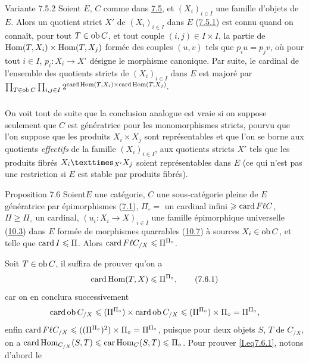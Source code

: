 \documentclass[10pt]{../fichiers-configuration-latex/smfart}
\begin{document}
\begin{enonce*}[remark]{Variante 7.5.2}
Soient $E$, $C$ comme dans \hyperref[I.cor7.5]{7.5}, et $(X_i)_{i\in I}$ une famille
d'objets de $E$. Alors un quotient strict $X'$ de $(X_i)_{i\in I}$
dans $E$ (\hyperref[I.sec7.5.1]{7.5.1}) est connu quand on connaît, pour tout
$T\in \operatorname{ob} C$,
et tout couple $(i,j)\in I\times I$, la partie de $\operatorname{Hom}(T,X_i)\times
\operatorname{Hom}(T,X_j)$ formée des couples $(u,v)$ tels que $p_iu=p_jv$, où
pour tout $i\in I$, $p_i:X_i\rightarrow X'$ désigne le morphisme
canonique. Par suite, le cardinal de l'ensemble des quotients
stricts de $(X_i)_{i\in I}$ dans $E$ est majoré par $ \prod_{T\in
\operatorname{ob} C} \prod_{i, j\in I}2^{\operatorname{card} \operatorname{Hom}(T,X_i)\times
  \operatorname{card}\operatorname{Hom}(T,X_j)}{}.
$
\end{enonce*}

\setcounter{subsubsection}{2}
\subsubsection{}
On voit tout de suite que la conclusion analogue est vraie si on
suppose seulement que $C$ est génératrice pour les monomorphismes
stricts, pourvu que l'on suppose que les produits $X_i\times X_j$
sont représentables et que l'on se borne aux quotients
\emph{effectifs} de la famille $(X_{i})_{i\in I}$, \ie aux quotients
stricts $X'$ tels que les produits fibrés $\fprod{X_i}{X_{j}}{X'}$
soient représentables dans $E$ (ce qui n'est pas une restriction si
$E$ est stable par produits fibrés).

\begin{enonce*}{Proposition 7.6}
Soient\pageoriginale $E$ une catégorie, $C$ une sous-catégorie
pleine de $E$ génératrice par épimorphismes
(\hyperref[I.def7.1]{7.1}), $\Pi_\circ=$ un
cardinal infini $\geqslant \operatorname{card}  F\ell  C$, $\Pi\geq \Pi_\circ$ un
cardinal, $(u_i:X_i\rightarrow X)_{i\in I}$ une famille épimorphique
universelle (\hyperref[I.sec10.3]{10.3}) dans $E$ formée de morphismes quarrables
(\hyperref[I.sec10.7]{10.7}) à sources $X_i\in\operatorname{ob} C$, et telle que $\operatorname{card} I\leqslant \Pi$.
Alors $\operatorname{card} F\ell  C_{/X}\leqslant \Pi^{\Pi_\circ}$.
\end{enonce*}

Soit $T\in \operatorname{ob} C$, il suffira de prouver qu'on a
\begin{equation*}
\operatorname{card}\operatorname{Hom}(T,X)\leqslant
  \Pi^{\Pi_\circ}{},\tag{7.6.1}
\end{equation*}\label{I.eq7.6.1}
car on en conclura successivement
$$
\operatorname{card}\operatorname{ob} C_{/X}\leqslant(\Pi^{\Pi_\circ})\times\operatorname{card} \operatorname{ob} C_{/X}\leqslant
(\Pi^{\Pi_\circ})\times \Pi_\circ=\Pi^{\Pi_\circ}{},
$$
enfin $\operatorname{card} F\ell C_{/X}\leqslant ((\Pi^{\Pi_\circ})^2)\times
\Pi_\circ=\Pi^{\Pi_\circ}$, puisque pour deux objets $S$, $T$ de
$C_{/X}$, on a $\operatorname{card} \operatorname{Hom}_{C_{/X}}(S,T)\leqslant
\operatorname{car}\operatorname{Hom}_C(S,T)\leqslant\Pi_\circ$. Pour prouver \ref{I.eq7.6.1}, notons d'abord le
\end{document}
